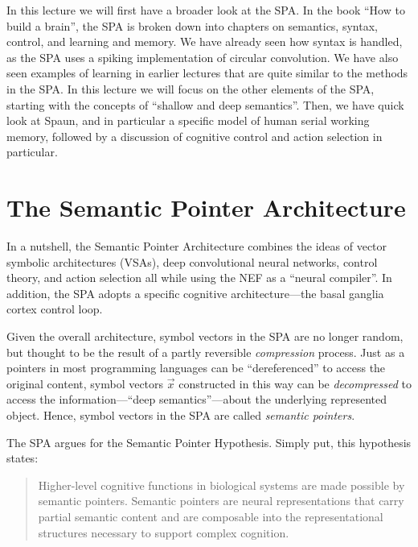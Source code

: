 \documentclass[10pt,letterpaper,oneside]{article}
\begin{document}
In this lecture we will first have a broader look at the SPA. In the book \enquote{How to build a brain}, the SPA is broken down into chapters on semantics, syntax, control, and learning and memory. We have already seen how syntax is handled, as the SPA uses a spiking implementation of circular convolution.  We have also seen examples of learning in earlier lectures that are quite similar to the methods in the SPA. In this lecture we will focus on the other elements of the SPA, starting with the concepts of \enquote{shallow and deep semantics}. Then, we have quick look at Spaun, and in particular a specific model of human serial working memory, followed by a discussion of cognitive control and action selection in particular.

\section{The Semantic Pointer Architecture}


In a nutshell, the Semantic Pointer Architecture combines the ideas of vector symbolic architectures (VSAs), deep convolutional neural networks, control theory, and action selection all while using the NEF as a \enquote{neural compiler}. In addition, the SPA adopts a specific cognitive architecture---the basal ganglia cortex control loop.

Given the overall architecture, symbol vectors in the SPA are no longer random, but thought to be the result of a partly reversible \emph{compression} process. Just as a pointers in most programming languages can be \enquote{dereferenced} to access the original content, symbol vectors $\vec x$ constructed in this way can be \emph{decompressed} to access the information---\enquote{deep semantics}---about the underlying represented object. Hence, symbol vectors in the SPA are called \emph{semantic pointers}.

The SPA argues for the Semantic Pointer Hypothesis. Simply put, this hypothesis states: 
\begin{quote}
Higher-level cognitive functions in biological systems are made possible by semantic pointers. Semantic pointers are neural representations that carry partial semantic content and are composable into the representational structures necessary to support complex cognition.
\end{quote}
\end{document}
